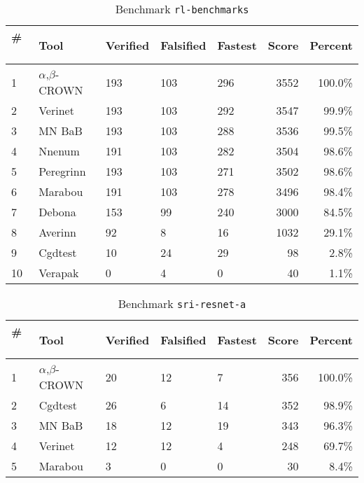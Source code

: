 
\begin{table}[h]
\begin{center}
\caption{Benchmark \texttt{rl-benchmarks}} \label{tab:cat_{cat}}
{\setlength{\tabcolsep}{2pt}
\begin{tabular}[h]{@{}lllllrr@{}}
\toprule
\textbf{\# ~} & \textbf{Tool} & \textbf{Verified} & \textbf{Falsified} & \textbf{Fastest} & \textbf{Score} & \textbf{Percent}\\
\midrule
1 & $\alpha$,$\beta$-CROWN & 193 & 103 & 296 & 3552 & 100.0\% \\
2 & Verinet & 193 & 103 & 292 & 3547 & 99.9\% \\
3 & MN BaB & 193 & 103 & 288 & 3536 & 99.5\% \\
4 & Nnenum & 191 & 103 & 282 & 3504 & 98.6\% \\
5 & Peregrinn & 193 & 103 & 271 & 3502 & 98.6\% \\
6 & Marabou & 191 & 103 & 278 & 3496 & 98.4\% \\
7 & Debona & 153 & 99 & 240 & 3000 & 84.5\% \\
8 & Averinn & 92 & 8 & 16 & 1032 & 29.1\% \\
9 & Cgdtest & 10 & 24 & 29 & 98 & 2.8\% \\
10 & Verapak & 0 & 4 & 0 & 40 & 1.1\% \\
\bottomrule
\end{tabular}
}
\end{center}
\end{table}




\begin{table}[h]
\begin{center}
\caption{Benchmark \texttt{sri-resnet-a}} \label{tab:cat_{cat}}
{\setlength{\tabcolsep}{2pt}
\begin{tabular}[h]{@{}lllllrr@{}}
\toprule
\textbf{\# ~} & \textbf{Tool} & \textbf{Verified} & \textbf{Falsified} & \textbf{Fastest} & \textbf{Score} & \textbf{Percent}\\
\midrule
1 & $\alpha$,$\beta$-CROWN & 20 & 12 & 7 & 356 & 100.0\% \\
2 & Cgdtest & 26 & 6 & 14 & 352 & 98.9\% \\
3 & MN BaB & 18 & 12 & 19 & 343 & 96.3\% \\
4 & Verinet & 12 & 12 & 4 & 248 & 69.7\% \\
5 & Marabou & 3 & 0 & 0 & 30 & 8.4\% \\
\bottomrule
\end{tabular}
}
\end{center}
\end{table}



